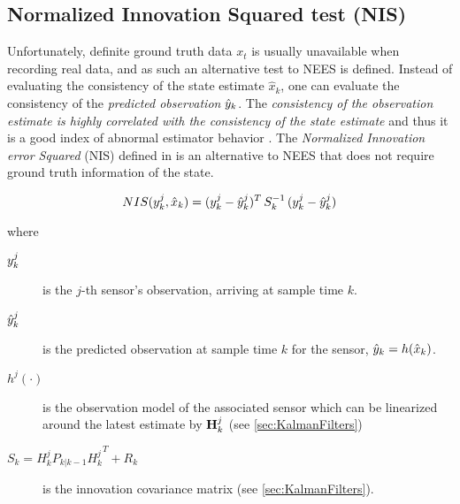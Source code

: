 \subsection{Normalized Innovation Squared test (NIS)}\label{ssec:NIS}
Unfortunately, definite ground truth data $x_t$ is usually unavailable when recording real data, and as such an alternative test to NEES is defined. Instead of evaluating the consistency of the state estimate $\hat{x}_k$, one can evaluate the consistency of the \emph{predicted observation} ${\hat{{y}}}_k$. The \emph{consistency of the observation estimate is highly correlated with the consistency of the state estimate} and thus it is a good index of abnormal estimator behavior \cite{Ivanov2014}. The \emph{Normalized Innovation error Squared} (NIS) defined in  is an alternative to NEES that does not require ground truth information of the state.


\begin{framed}
	
\begin{equation}\label{eq:NIS}
NIS({y}^j_k,\hat{x}_k) = ({{y}}^j_k - {{\hat{{y}}}}^j_k)^T \, S_k^{-1} \, ({{y}}^j_k - {{\hat{{y}}}}^j_k)
\end{equation}

where

\begin{description}
	\item[$ {y}^j_k $] is the $j$-th sensor's observation, arriving at sample time $k$.
	\item[$ {\hat{{y}}}^j_k $] is the predicted observation at sample time $k$ for the  sensor, \ie $ {\hat{{y}}}_k =  h(\hat{x}_k)$.
	\item[$h^j(\cdot)$] is the observation model of the associated sensor which can be linearized around the latest estimate by $\mathbf{H}^j_k$ (see \cref{sec:KalmanFilters})
	\item[$S_k = H^j_k P_{k|k-1} {H^j_k}^T + R_k$] is the innovation covariance matrix (see \cref{sec:KalmanFilters}).
\end{description}
\end{framed}

